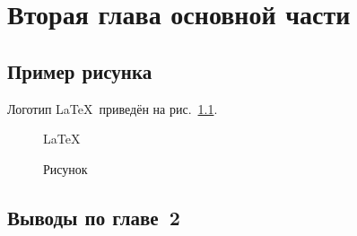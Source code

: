 \chapter{Вторая глава основной части}\label{chap:2}

\section{Пример рисунка}

Логотип \LaTeX~приведён на рис.~\ref{fig:latex}.

\begin{figure}[ht]
\centering
  \Huge\LaTeX
  \caption{Рисунок}
  \label{fig:latex}
\end{figure}

\section{Выводы по главе~2}

